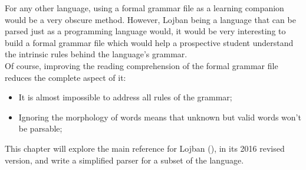For any other language, using a formal grammar file as a learning companion would be a very obscure method. However, Lojban being a language that can be parsed just as a programming language would, it would be very interesting to build a formal grammar file which would help a prospective student understand the intrinsic rules behind the language's grammar. \\

Of course, improving the reading comprehension of the formal grammar file reduces the complete aspect of it:

\begin{itemize}
  \item It is almost impossible to address all rules of the grammar;
  \item Ignoring the morphology of words means that unknown but valid words won't be parsable;
\end{itemize}

This chapter will explore the main reference for Lojban (\cite{cowan1997complete}), in its 2016 revised version, and write a simplified parser for a subset of the language.